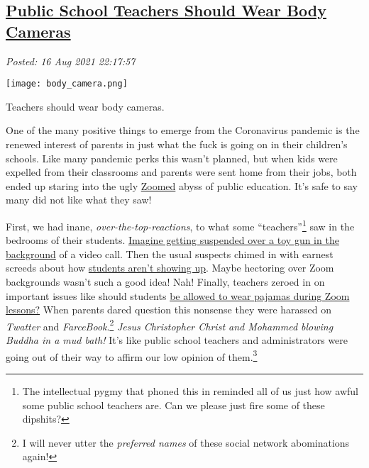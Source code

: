 %

\subsection*{\href{http://analyzethedatanotthedrivel.org/2021/08/16/public-school-teachers-should-wear-body-cameras/}{Public School Teachers Should Wear Body Cameras}}


\noindent\emph{Posted: 16 Aug 2021 22:17:57}
\vspace{6pt}


 \captionsetup[floatingfigure]{labelformat=empty}
 \begin{floatingfigure}[l]{0.25\textwidth}
 \centering
 \texttt{[image: body\_camera.png]}
 \caption{Teachers should wear body cameras.}
 \label{fig:7202x0}
 \end{floatingfigure} One of the many positive things to emerge from the Coronavirus pandemic
is the renewed interest of parents in just what the fuck is going on in
their children's schools. Like many pandemic perks this wasn't planned,
but when kids were expelled from their classrooms and parents were sent
home from their jobs, both ended up staring into the ugly
\href{https://zoom.us/}{Zoomed} abyss of public education. It's safe to
say many did not like what they saw!

First, we had inane, \emph{over-the-top-reactions}, to what some
``teachers''\footnote{The intellectual pygmy that phoned this in reminded all of us just how
  awful some public school teachers are. Can we please just fire some of
  these dipshits?
} saw in the
bedrooms of their students.
\href{https://www.cnn.com/2020/09/26/us/student-suspended-gun-virtual/index.html}{Imagine
getting suspended over a toy gun in the background} of a video call.
Then the usual suspects chimed in with earnest screeds about how
\href{https://www.the74million.org/article/how-missing-zoom-classes-could-funnel-kids-into-the-juvenile-justice-system-and-why-some-experts-say-now-is-the-time-to-reform-truancy-rules/}{students
aren't showing up}. Maybe hectoring over Zoom backgrounds wasn't such a
good idea! Nah! Finally, teachers zeroed in on important issues like
should students
\href{https://www.smartclassroommanagement.com/2020/08/22/students-pajamas-zoom-lessons/}{be
allowed to wear pajamas during Zoom lessons?} When parents dared
question this nonsense they were harassed on \emph{Twatter} and
\emph{FarceBook}.\footnote{I will never utter the \emph{preferred names} of these social network
  abominations again!} \emph{Jesus Christopher Christ and Mohammed blowing Buddha in a mud
bath!} It's like public school teachers and administrators were going
out of their way to affirm our low opinion of
them.\protect\hyperlink{fn3}{\textsuperscript{3}}


